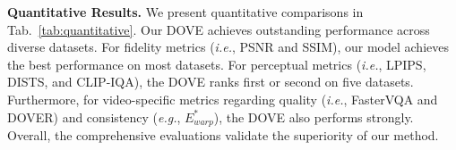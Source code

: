 \documentclass{article}
\newcommand\eg{\textit{e.g.}}
\newcommand\ie{\textit{i.e.}}
\begin{document}
\noindent \textbf{Quantitative Results.}
We present quantitative comparisons in Tab.~\ref{tab:quantitative}. Our DOVE achieves outstanding performance across diverse datasets. For fidelity metrics (\ie, PSNR and SSIM), our model achieves the best performance on most datasets. For perceptual metrics (\ie, LPIPS, DISTS, and CLIP-IQA), the DOVE ranks first or second on five datasets. Furthermore, for video-specific metrics regarding quality (\ie, FasterVQA and DOVER) and consistency (\eg, $E^*_{warp}$), the DOVE also performs strongly. Overall, the comprehensive evaluations validate the superiority of our method.



\begin{figure}[!t]
\scriptsize
\centering
\begin{tabular}{cccccccc}


\end{tabular}
\end{figure}
\end{document}
